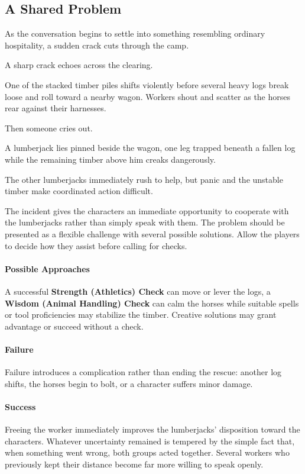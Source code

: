 \subsection*{A Shared Problem}
{\entryfont As the conversation begins to settle into something resembling ordinary hospitality, a sudden crack cuts through the camp.}
\begin{DndReadAloud}
	A sharp crack echoes across the clearing.

	One of the stacked timber piles shifts violently before several heavy logs break loose and roll toward a nearby wagon. Workers shout and scatter as the horses rear against their harnesses.

	Then someone cries out.

	A lumberjack lies pinned beside the wagon, one leg trapped beneath a fallen log while the remaining timber above him creaks dangerously.
	
	The other lumberjacks immediately rush to help, but panic and the unstable timber make coordinated action difficult.
\end{DndReadAloud}
{\noindent\entryfont The incident gives the characters an immediate opportunity to cooperate with the lumberjacks rather than simply speak with them. The problem should be presented as a flexible challenge with several possible solutions. Allow the players to decide how they assist before calling for checks. \\
\paragraph*{Possible Approaches} A successful \textbf{Strength (Athletics) Check} can move or lever the logs, a \textbf{Wisdom (Animal Handling) Check} can calm the horses while suitable spells or tool proficiencies may stabilize the timber. Creative solutions may grant advantage or succeed without a check.\\
\paragraph*{Failure} Failure introduces a complication rather than ending the rescue: another log shifts, the horses begin to bolt, or a character suffers minor damage.\\
\paragraph*{Success} Freeing the worker immediately improves the lumberjacks' disposition toward the characters. Whatever uncertainty remained is tempered by the simple fact that, when something went wrong, both groups acted together. Several workers who previously kept their distance become far more willing to speak openly.}
